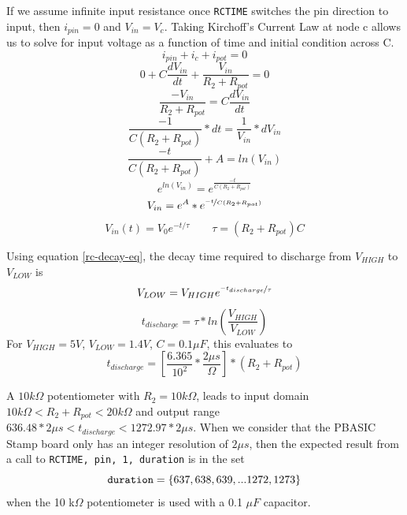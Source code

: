\documentclass[11pt]{article}
\begin{document}
If we assume infinite input resistance once \texttt{RCTIME} switches
the pin direction to input, then $i_{pin}=0$ and $V_{in}=V_{c}$.
Taking Kirchoff's Current Law at node c allows us to solve for input
voltage as a function of time and initial condition across C.
\begin{equation*}
i_{pin}+i_{c}+i_{pot}=0
\end{equation*}
\begin{equation*}
0+C\frac{dV_{in}}{dt}+\frac{V_{in}}{R_{2}+R_{pot}}=0
\end{equation*}
\begin{equation*}
\frac{-V_{in}}{R_{2}+R_{pot}}=C\frac{dV_{in}}{dt}
\end{equation*}
\begin{equation*}
\frac{-1}{C(R_{2}+R_{pot})}*dt=\frac{1}{V_{in}}*dV_{in}
\end{equation*}
\begin{equation*}
\frac{-t}{C(R_{2}+R_{pot})}+A=ln(V_{in})
\end{equation*}
\begin{equation*}
e^{ln(V_{in})}=e^{\frac{-t}{C(R_{2}+R_{pot})}}
\end{equation*}
\begin{equation*}
V_{in}=e^{A}*e^{\nicefrac{-t}{C(R_{2}+R_{pot})}}
\end{equation*}
\begin{equation}
V_{in}(t)=V_{0}e^{-t/\tau} \quad \quad \tau=(R_{2}+R_{pot})C
\label{rc-decay-eq}
\end{equation}

Using equation \ref{rc-decay-eq}, the decay time required to discharge
from $V_{HIGH}$ to $V_{LOW}$ is
\begin{equation*}
V_{LOW}=V_{HIGH}e^{\nicefrac{-t_{discharge}}{\tau}}
\end{equation*}
\begin{equation*}
t_{discharge}=\tau*ln\left(\frac{V_{HIGH}}{V_{LOW}}\right)
\end{equation*}
For $V_{HIGH}=5V$, $V_{LOW}=1.4V$, $C=0.1\mu F$, this evaluates to
\begin{equation}
t_{discharge}=\left[\frac{6.365}{10^{2}}*\frac{2\mu s}{\Omega}\right]*(R_{2}+R_{pot})
\label{t-discharge-eq}
\end{equation}

A $10k\Omega$ potentiometer with $R_{2}=10k\Omega$, leads to input
domain $10k\Omega<R_{2}+R_{pot}<20k\Omega$ and output range
$636.48*2\mu s<t_{discharge}<1272.97*2\mu s$. When we consider
that the PBASIC Stamp board only has an integer resolution of
$2 \mu s$, then the expected result from a call to
\mbox{\texttt{RCTIME, pin, 1, duration}} is in the set
\begin{equation}
\textrm{\texttt{duration}}=\{637, 638, 639,...1272, 1273\}
\end{equation}
when the 10 k$\Omega$ potentiometer is used with a 0.1 $\mu F$ capacitor.
\end{document}
